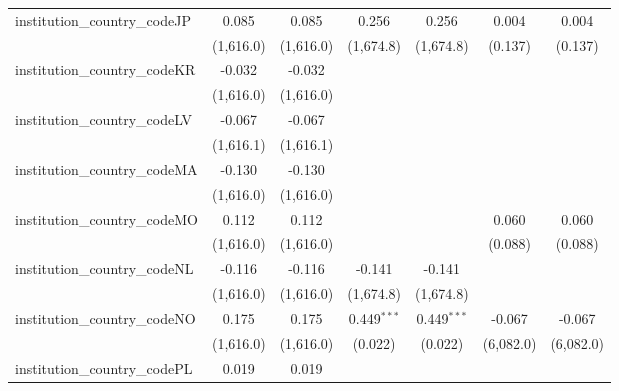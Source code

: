\begin{tabular}{lcccccc}
   institution\_country\_codeJP          & 0.085          & 0.085          & 0.256         & 0.256         & 0.004        & 0.004\\   
                                         & (1,616.0)      & (1,616.0)      & (1,674.8)     & (1,674.8)     & (0.137)      & (0.137)\\   
   institution\_country\_codeKR          & -0.032         & -0.032         &               &               &              &   \\   
                                         & (1,616.0)      & (1,616.0)      &               &               &              &   \\   
   institution\_country\_codeLV          & -0.067         & -0.067         &               &               &              &   \\   
                                         & (1,616.1)      & (1,616.1)      &               &               &              &   \\   
   institution\_country\_codeMA          & -0.130         & -0.130         &               &               &              &   \\   
                                         & (1,616.0)      & (1,616.0)      &               &               &              &   \\   
   institution\_country\_codeMO          & 0.112          & 0.112          &               &               & 0.060        & 0.060\\   
                                         & (1,616.0)      & (1,616.0)      &               &               & (0.088)      & (0.088)\\   
   institution\_country\_codeNL          & -0.116         & -0.116         & -0.141        & -0.141        &              &   \\   
                                         & (1,616.0)      & (1,616.0)      & (1,674.8)     & (1,674.8)     &              &   \\   
   institution\_country\_codeNO          & 0.175          & 0.175          & 0.449$^{***}$ & 0.449$^{***}$ & -0.067       & -0.067\\   
                                         & (1,616.0)      & (1,616.0)      & (0.022)       & (0.022)       & (6,082.0)    & (6,082.0)\\   
   institution\_country\_codePL          & 0.019          & 0.019          &               &               &              &   \\   

\end{tabular}
